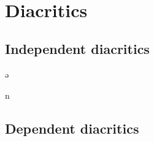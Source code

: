 \documentclass{article}
\begin{document}
{%
  \bfseries
  
  \textsci\ 

  \textscy\ 
  
  \textepsilon\ 

  \textbari\ 

  \textbaru\ 

  \textupsilon\ 

  \textreve\ 

  \textbaro\ 

  \textschwa\ 

  \textrevepsilon\ 

  \textcloserevepsilon\ \textipa{&}

  \textturna\ 

  \textturnm\ 

  \textramshorns\ 

  \textturnv\ 

  \textopeno\ 

  \textscripta\ 

  \textturnscripta\ 
}

\section{Diacritics}

\subsection{Independent diacritics}

{%
  \bfseries
  
  ə\textrhoticity\ 

  n\textcorner {}

   
}

\subsection{Dependent diacritics}
\end{document}
